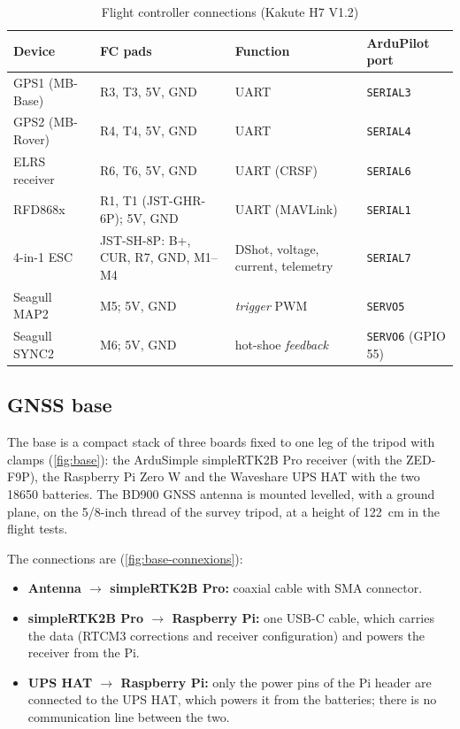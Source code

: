 \begin{table}[H]
    \centering
    \caption{Flight controller connections (Kakute H7 V1.2)}
    \label{tab:connexions}
    \small
    \begin{tabular}{P{3.2cm}P{3.9cm}P{3.5cm}P{2.6cm}}
        \toprule
        Device & FC pads & Function & ArduPilot port \\
        \midrule
        GPS1 (MB-Base) & R3, T3, 5V, GND & UART & \texttt{SERIAL3} \\
        GPS2 (MB-Rover) & R4, T4, 5V, GND & UART & \texttt{SERIAL4} \\
        ELRS receiver & R6, T6, 5V, GND & UART (CRSF) & \texttt{SERIAL6} \\
        RFD868x & R1, T1 (JST-GHR-6P); 5V, GND & UART (MAVLink) & \texttt{SERIAL1} \\
        4-in-1 ESC & JST-SH-8P: B+, CUR, R7, GND, M1--M4 & DShot, voltage, current, telemetry & \texttt{SERIAL7} \\
        Seagull MAP2 & M5; 5V, GND & \emph{trigger} PWM & \texttt{SERVO5} \\
        Seagull SYNC2 & M6; 5V, GND & hot-shoe \emph{feedback} & \texttt{SERVO6} (GPIO 55) \\
        \bottomrule
    \end{tabular}
\end{table}

\subsection{GNSS base}
\label{subsec:muntatge-base}

The base is a compact stack of three boards fixed to one leg of the tripod with clamps (\cref{fig:base}): the ArduSimple simpleRTK2B Pro receiver (with the ZED-F9P), the Raspberry Pi Zero W and the Waveshare UPS HAT with the two 18650 batteries. The BD900 GNSS antenna is mounted levelled, with a ground plane, on the 5/8-inch thread of the survey tripod, at a height of 122~cm in the flight tests.

The connections are (\cref{fig:base-connexions}):
\begin{itemize}
    \item \textbf{Antenna $\rightarrow$ simpleRTK2B Pro:} coaxial cable with SMA connector.
    \item \textbf{simpleRTK2B Pro $\rightarrow$ Raspberry Pi:} one USB-C cable, which carries the data (RTCM3 corrections and receiver configuration) and powers the receiver from the Pi.
    \item \textbf{UPS HAT $\rightarrow$ Raspberry Pi:} only the power pins of the Pi header are connected to the UPS HAT, which powers it from the batteries; there is no communication line between the two.
\end{itemize}

